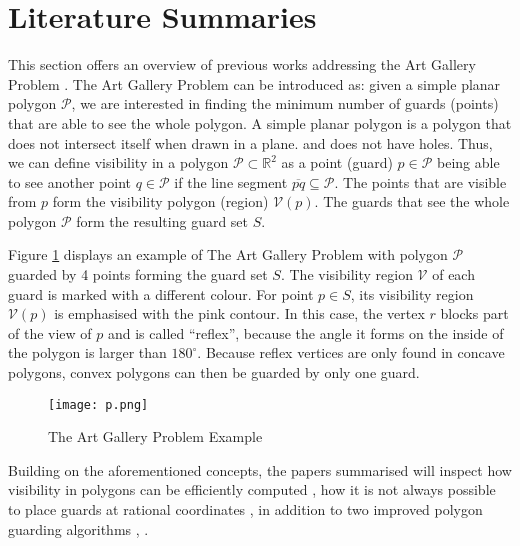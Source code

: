 \section{Literature Summaries}
This section offers an overview of previous works addressing the Art Gallery Problem \cite{o1987art}. The Art Gallery Problem \cite{o1987art} can be introduced as: given a simple planar polygon $\mathcal P$, we are interested in finding the minimum number of guards (points) that are able to see the whole polygon. A simple planar polygon is a polygon that does not intersect itself when drawn in a plane. and does not have holes. Thus, we can define visibility in a polygon $\mathcal P \subset \mathbb R^2$ as a point (guard) $p \in \mathcal P$ being able to see another point $q \in \mathcal P$ if the line segment $\overline{pq} \subseteq \mathcal P$. The points that are visible from $p$ form the visibility polygon (region) $\mathcal V(p)$. The guards that see the whole polygon $\mathcal P$ form the resulting guard set $S$.

Figure \ref{fig:art} displays an example of The Art Gallery Problem \cite{o1987art} with polygon $\mathcal P$ guarded by 4 points forming the guard set $S$. The visibility region $\mathcal V$ of each guard is marked with a different colour. For point $p \in S$, its visibility region $\mathcal V(p)$ is emphasised with the pink contour. In this case, the vertex $r$ blocks part of the view of $p$ and is called ``reflex'', because the angle it forms on the inside of the polygon is larger than $180^\circ$. Because reflex vertices are only found in concave polygons, convex polygons can then be guarded by only one guard.

\begin{figure}[h!]
    \centering
    \texttt{[image: p.png]}
    \caption{The Art Gallery Problem \cite{o1987art} Example}
    \label{fig:art}
\end{figure}
Building on the aforementioned concepts, the papers summarised will inspect how visibility in polygons can be efficiently computed \cite{DBLP:journals/corr/BungiuHHHK14}, how it is not always possible to place guards at rational coordinates \cite{abrahamsen2021art}, in addition to two improved polygon guarding algorithms \cite{maleki2022implementation}, \cite{DBLP:journals/corr/abs-2007-06920}.





\newpage

